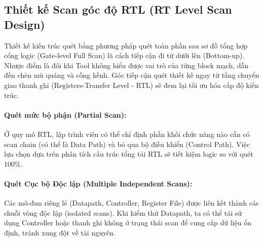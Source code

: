 \subsection{Thiết kế Scan góc độ RTL (RT Level Scan Design)}
Thiết kế kiến trúc quét bằng phương pháp quét toàn phần sau sơ đồ tổng hợp cổng logic (Gate-level Full Scan) là cách tiếp cận đi từ dưới lên (Bottom-up). Nhược điểm là đôi khi Tool không hiểu được vai trò của từng block mạch, dẫn đến chèn mù quáng và cồng kềnh. Góc tiếp cận quét thiết kế ngay từ tầng chuyển giao thanh ghi (Registers-Transfer Level - RTL) sẽ đem lại tối ưu hóa cấp độ kiến trúc.

\paragraph{Quét mức bộ phận (Partial Scan):}
Ở quy mô RTL, lập trình viên có thể chỉ định phần khối chức năng nào cần có scan chain (có thể là Data Path) và bỏ qua bộ điều khiển (Control Path). Việc lựa chọn dựa trên phân tích cấu trúc tổng tải RTL sẽ tiết kiệm logic so với quét 100\%. 

\paragraph{Quét Cục bộ Độc lập (Multiple Independent Scans):}
Các mô-đun riêng lẻ (Datapath, Controller, Register File) được liên kết thành các chuỗi vòng độc lập (isolated scans). Khi kiểm thử Datapath, ta có thể tái sử dụng Controller hoặc thanh ghi không ở trạng thái scan để cung cấp dữ liệu ổn định, tránh xung đột về tài nguyên. 
